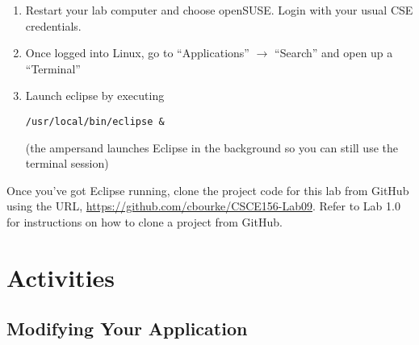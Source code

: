 \documentclass[12pt]{scrartcl}
\begin{document}
\begin{enumerate}
  \item Restart your lab computer and choose openSUSE.   Login with 
    your usual CSE credentials.
  \item Once logged into Linux, go to ``Applications'' $\rightarrow$ 
  	``Search'' and open up a ``Terminal''
  \item Launch eclipse by executing 
	
	\texttt{/usr/local/bin/eclipse &}
	
	(the ampersand launches Eclipse in the background so you can 
	still use the terminal session)
\end{enumerate}

Once you've got Eclipse running, clone the project code for this lab 
from GitHub using the URL, \url{https://github.com/cbourke/CSCE156-Lab09}.  Refer to Lab 1.0 for instructions on how to clone a 
project from GitHub.	

\section*{Activities}

\subsection*{Modifying Your Application}
\end{document}
